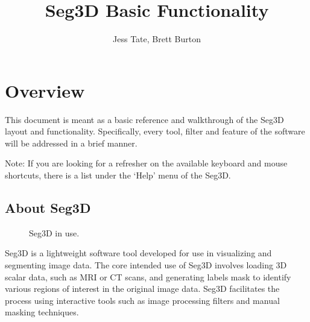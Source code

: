 \documentclass[fleqn,11pt,openany]{book}
\title{Seg3D Basic Functionality}
\author{Jess Tate, Brett Burton}
\begin{document}


\maketitle


\chapter{Overview}
\label{sec:overview}

\begin{introduction}
This document is meant as a basic reference and walkthrough of the Seg3D layout and functionality.  Specifically, every tool, filter and feature of the software will be addressed in a brief manner.

Note:  If you are looking for a refresher on the available keyboard and mouse shortcuts, there is a list under the `Help' menu of the Seg3D.  
\end{introduction}

\section{About Seg3D}

\begin{figure}
\caption{Seg3D in use.}\label{fig:layout}
\end{figure}

Seg3D is a lightweight software tool developed for use in visualizing and segmenting image data.  The core intended use of Seg3D involves loading 3D scalar data, such as MRI or CT scans, and generating labels mask to identify various regions of interest in the original image data.  Seg3D facilitates the process using interactive tools such as image processing filters and manual masking techniques.  
\end{document}

